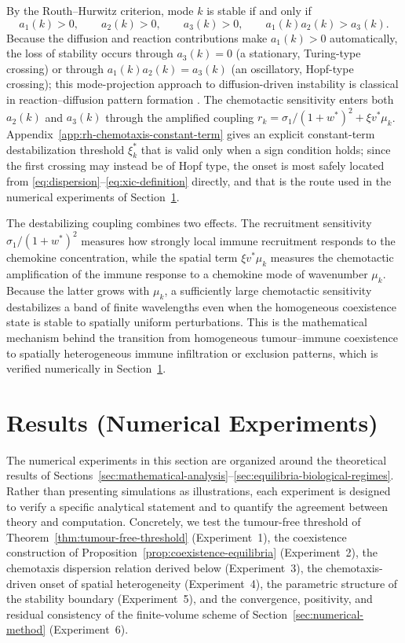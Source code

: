 \documentclass[a4paper,fleqn,longmktitle]{cas-sc}
\theoremstyle{plain}
\theoremstyle{definition}
\numberwithin{equation}{section}
\begin{document}
By the Routh--Hurwitz criterion, mode $k$ is
stable if and only if
\begin{equation}\label{eq:rh-mainbody}
a_1(k)>0,\qquad a_2(k)>0,\qquad a_3(k)>0,\qquad a_1(k)a_2(k)>a_3(k).
\end{equation}
Because the diffusion and reaction contributions make $a_1(k)>0$ automatically,
the loss of stability occurs through $a_3(k)=0$ (a stationary, Turing-type
crossing) or through $a_1(k)a_2(k)=a_3(k)$ (an oscillatory, Hopf-type crossing);
this mode-projection approach to diffusion-driven instability is classical in
reaction--diffusion pattern formation \cite{murray2003mathematical}.
The chemotactic sensitivity enters both $a_2(k)$ and $a_3(k)$ through the
amplified coupling $r_k=\sigma_1/(1+w^*)^2+\xi v^*\mu_k$. Appendix~\ref{app:rh-chemotaxis-constant-term}
gives an explicit constant-term destabilization threshold $\xi_k^*$ that is valid
only when a sign condition holds; since the first crossing may instead be of
Hopf type, the onset is most safely located from \eqref{eq:dispersion}--\eqref{eq:xic-definition}
directly, and that is the route used in the numerical experiments of
Section~\ref{sec:numerical-experiments}.

The destabilizing coupling combines two effects. The recruitment sensitivity
$\sigma_1/(1+w^*)^2$ measures how strongly local immune recruitment responds to
the chemokine concentration, while the spatial term $\xi v^*\mu_k$ measures the
chemotactic amplification of the immune response to a chemokine mode of
wavenumber $\mu_k$. Because the latter grows with $\mu_k$, a sufficiently large
chemotactic sensitivity destabilizes a band of finite wavelengths even when the
homogeneous coexistence state is stable to spatially uniform perturbations. This
is the mathematical mechanism behind the transition from homogeneous
tumour--immune coexistence to spatially heterogeneous immune infiltration or
exclusion patterns, which is verified numerically in
Section~\ref{sec:numerical-experiments}.

\section{Results (Numerical Experiments)}
\label{sec:numerical-experiments}

The numerical experiments in this section are organized around the theoretical
results of Sections~\ref{sec:mathematical-analysis}--\ref{sec:equilibria-biological-regimes}.
Rather than presenting simulations as illustrations, each experiment is designed
to verify a specific analytical statement and to quantify the agreement
between theory and computation. Concretely, we test the tumour-free threshold of
Theorem~\ref{thm:tumour-free-threshold} (Experiment~1), the coexistence
construction of Proposition~\ref{prop:coexistence-equilibria}
(Experiment~2), the chemotaxis dispersion relation derived below
(Experiment~3), the chemotaxis-driven onset of spatial heterogeneity
(Experiment~4), the parametric structure of the stability boundary
(Experiment~5), and the convergence, positivity, and residual consistency of the
finite-volume scheme of Section~\ref{sec:numerical-method} (Experiment~6).
\end{document}
